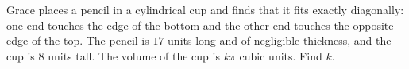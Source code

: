 Grace places a pencil in a cylindrical cup and finds that it fits exactly diagonally: one end touches the edge of the bottom and the other end touches the opposite edge of the top. The pencil is $17$ units long and of negligible thickness, and the cup is $8$ units tall. The volume of the cup is $k\pi$ cubic units. Find $k$.
